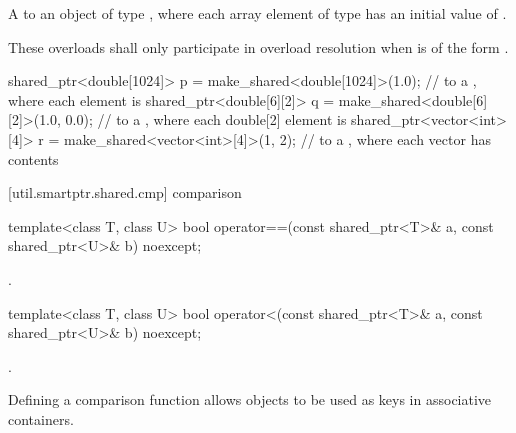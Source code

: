 \begin{itemdescr}
\pnum
\returns A  to an object of type ,
where each array element of type 
has an initial value of .

\pnum
\remarks These overloads shall only participate in overload resolution
when  is of the form .

\pnum
\begin{example}
\begin{codeblock}
shared_ptr<double[1024]> p = make_shared<double[1024]>(1.0);
  //  to a , where each element is 
shared_ptr<double[6][2]> q = make_shared<double[6][2]>({1.0, 0.0});
  //  to a , where each double[2] element is 
shared_ptr<vector<int>[4]> r = make_shared<vector<int>[4]>({1, 2});
  //  to a , where each vector has contents 
\end{codeblock}
\end{example}
\end{itemdescr}

[util.smartptr.shared.cmp]{ comparison}

%
\begin{itemdecl}
template<class T, class U>
  bool operator==(const shared_ptr<T>& a, const shared_ptr<U>& b) noexcept;
\end{itemdecl}

\begin{itemdescr}
\pnum
\returns {}.
\end{itemdescr}

%
\begin{itemdecl}
template<class T, class U>
  bool operator<(const shared_ptr<T>& a, const shared_ptr<U>& b) noexcept;
\end{itemdecl}

\begin{itemdescr}
\pnum
\returns {}.

\pnum
\begin{note}
Defining a comparison function allows  objects to be
used as keys in associative containers.
\end{note}
\end{itemdescr}


